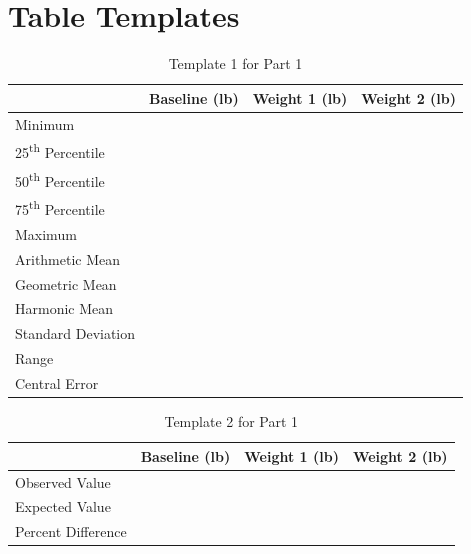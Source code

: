 \section{Table Templates}
%
\begin{table}[ht!]
    \begin{center}
        \begin{tabular}{l | l | l | l}
            & \textbf{Baseline} (lb) & \textbf{Weight 1} (lb) & \textbf{Weight 2} (lb) \\
            \hline
            Minimum & & & \\
            25\textsuperscript{th} Percentile & & & \\
            50\textsuperscript{th} Percentile & & & \\
            75\textsuperscript{th} Percentile & & & \\
            Maximum & & & \\
            \hline
            Arithmetic Mean & & & \\
            Geometric Mean & & & \\
            Harmonic Mean & & & \\
            Standard Deviation & & & \\
            \hline
            Range & & & \\
            Central Error & & & \\
            \hline
        \end{tabular}
    \end{center}
    \caption{Template 1 for Part 1}
    \label{table.00.template.1}
\end{table}
%
\begin{table}[ht!]
    \begin{center}
        \begin{tabular}{l | l | l | l}
            & \textbf{Baseline} (lb) & \textbf{Weight 1} (lb) & \textbf{Weight 2} (lb) \\
            \hline
            Observed Value & & & \\
            Expected Value & & & \\
            \hline
            Percent Difference & & & \\
            \hline
        \end{tabular}
    \end{center}
    \caption{Template 2 for Part 1}
    \label{table.00.template.2}
\end{table}
%
